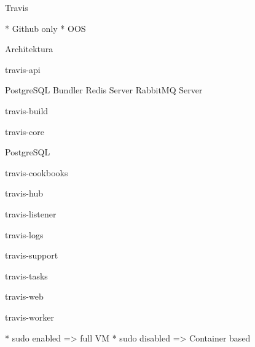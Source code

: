 \chap Travis

\begitems
* Github only
* OOS
\enditems

\sec Architektura

\secc travis-api

PostgreSQL
Bundler
Redis Server
RabbitMQ Server

\secc travis-build

\secc travis-core

PostgreSQL

\secc travis-cookbooks

\secc travis-hub

\secc travis-listener

\secc travis-logs

\secc travis-support

\secc travis-tasks

\secc travis-web

\secc travis-worker

\begitems
* sudo enabled => full VM
* sudo disabled => Container based
\enditems

